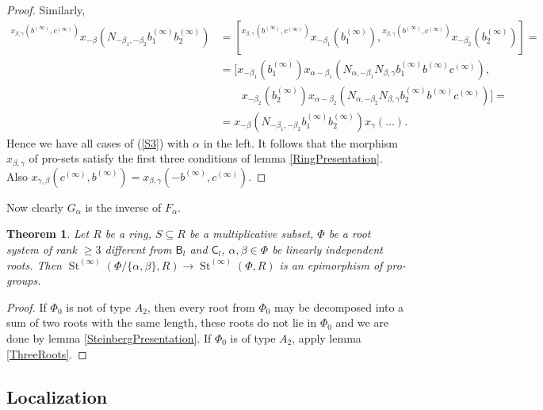 \documentclass{article}
\numberwithin{equation}{section}
\newtheorem{theorem}{Theorem}
\theoremstyle{definition}
\theoremstyle{remark}
\DeclareMathOperator\St{St}
\newcommand{\up}[2]{{^{#1}\!{#2}}}
\newcommand{\rB}{\mathsf{B}}
\newcommand{\rC}{\mathsf{C}}
\begin{document}
\begin{proof}
 Similarly,
 \begin{align*}
  \up{x_{\beta, \gamma}(b^{(\infty)}, c^{(\infty)})}
   {x_{-\beta}(N_{-\beta_1, -\beta_2} b_1^{(\infty)} b_2^{(\infty)})}
  &= [\up{x_{\beta, \gamma}(b^{(\infty)}, c^{(\infty)})}
   {x_{-\beta_1}(b_1^{(\infty)})},
  \up{x_{\beta, \gamma}(b^{(\infty)}, c^{(\infty)})}
   {x_{-\beta_2}(b_2^{(\infty)})}] =\\
  &= [x_{-\beta_1}(b_1^{(\infty)})
   x_{\alpha - \beta_1}(N_{\alpha, -\beta_1} N_{\beta, \gamma}
   b_1^{(\infty)} b^{(\infty)} c^{(\infty)}),\\
  &\qquad x_{-\beta_2}(b_2^{(\infty)})
   x_{\alpha - \beta_2}(N_{\alpha, -\beta_2} N_{\beta, \gamma}
   b_2^{(\infty)} b^{(\infty)} c^{(\infty)})] =\\
  &= x_{-\beta}(N_{-\beta_1, -\beta_2}
   b_1^{(\infty)} b_2^{(\infty)})
   x_\gamma(\ldots).
 \end{align*}
 Hence we have all cases of (\ref{S3}) with \(\alpha\) in the left. It follows that the morphism \(x_{\beta, \gamma}\) of pro-sets satisfy the first three conditions of lemma \ref{RingPresentation}. Also \(x_{\gamma, \beta}(c^{(\infty)}, b^{(\infty)}) = x_{\beta, \gamma}(-b^{(\infty)}, c^{(\infty)})\).
\end{proof}
 
 Now clearly \(G_\alpha\) is the inverse of \(F_\alpha\).


 \begin{theorem}\label{DoubleRootElimination}
  Let \(R\) be a ring, \(S \subseteq R\) be a multiplicative subset, \(\Phi\) be a root system of rank \(\geq 3\) different from \(\rB_l\) and \(\rC_l\), \(\alpha, \beta \in \Phi\) be linearly independent roots. Then \(\St^{(\infty)}(\Phi / \{\alpha, \beta\}, R) \to \St^{(\infty)}(\Phi, R)\) is an epimorphism of pro-groups.
 \end{theorem}
 \begin{proof}
  If \(\Phi_0\) is not of type \(A_2\), then every root from \(\Phi_0\) may be decomposed into a sum of two roots with the same length, these roots do not lie in \(\Phi_0\) and we are done by lemma \ref{SteinbergPresentation}. If \(\Phi_0\) is of type \(A_2\), apply lemma \ref{ThreeRoots}.
 \end{proof}


\subsection{Localization}
\end{document}
